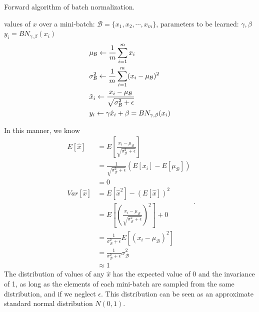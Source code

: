 \documentclass[10pt,onecolumn]{book}
\begin{document}
\begin{algorithm}
	\renewcommand{\algorithmicrequire}{\textbf{Input:}}
	\renewcommand{\algorithmicensure}{\textbf{Output:}}
	\caption{Forward algorithm of batch normalization.}
	\begin{algorithmic}[1]
		\REQUIRE values of $x$ over a mini-batch: $\mathcal{B}=\{x_1, x_2, \cdots, x_m\}$, parameters to be learned: $\gamma, \beta$
		\ENSURE$y_i = BN_{\gamma, \beta}(x_i)$
		\begin{equation}
		\begin{split}
		& \mu_\mathcal{B} \gets \frac{1}{m} \sum_{i=1}^m x_i \\
		& \sigma^2_\mathcal{B} \gets \frac{1}{m} \sum_{i=1}^m (x_i - \mu_\mathcal{B})^2 \\
		& \hat{x}_i \gets \frac{x_i - \mu_\mathcal{B}}{\sqrt{\sigma^2_\mathcal{B} + \epsilon}} \\
		& y_i \gets \gamma\hat{x}_i + \beta = BN_{\gamma, \beta}(x_i)
		\end{split}
		\notag
		\end{equation}
	\end{algorithmic}  
\end{algorithm}
In this manner, we know 
\begin{equation}
\begin{split}
E[\hat{x}] &= E[\frac{x_i - \mu_\mathcal{B}}{\sqrt{\sigma^2_\mathcal{B} + \epsilon}}] \\
		&= \frac{1}{\sqrt{\sigma^2_\mathcal{B} + \epsilon}} (E[x_i] - E[\mu_\mathcal{B}]) \\
		&= 0 \\
Var[\hat{x}] &= E[\hat{x}^2] - (E[\hat{x}])^2 \\
			&= E[(\frac{x_i - \mu_\mathcal{B}}{\sqrt{\sigma^2_\mathcal{B} + \epsilon}})^2] + 0 \\
			& = \frac{1}{\sigma^2_\mathcal{B} + \epsilon} E[(x_i - \mu_\mathcal{B})^2] \\
			& = \frac{1}{\sigma^2_\mathcal{B} + \epsilon} \sigma^2_\mathcal{B} \\
			& \approx 1
\end{split}.
\end{equation}
The distribution of values of any $\hat{x}$ has the expected value of 0 and the invariance of 1, as long as the elements of each mini-batch are sampled from the same distribution, and if we neglect $\epsilon$. This distribution can be seen as an approximate standard normal distribution $N(0, 1)$.
\end{document}
